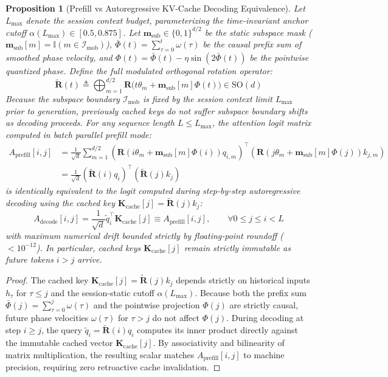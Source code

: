 \documentclass[11pt,a4paper]{article}
\newtheorem{proposition}[theorem]{Proposition}
\theoremstyle{definition}
\begin{document}
\begin{proposition}[Prefill vs Autoregressive KV-Cache Decoding Equivalence]
\label{prop:kv_cache}
Let $L_{\max}$ denote the session context budget, parameterizing the time-invariant anchor cutoff $\alpha(L_{\max}) \in [0.5, 0.875]$. Let $\mathbf{m}_{\text{sub}} \in \{0, 1\}^{d/2}$ be the static subspace mask ($\mathbf{m}_{\text{sub}}[m] = \mathbb{I}(m \in \mathcal{I}_{\text{mob}})$), $\bar{\Phi}(t) = \sum_{\tau=0}^t \omega(\tau)$ be the causal prefix sum of smoothed phase velocity, and $\Phi(t) = \bar{\Phi}(t) - \eta\sin(2\bar{\Phi}(t))$ be the pointwise quantized phase. Define the full modulated orthogonal rotation operator:
\begin{equation}
\tilde{\mathbf{R}}(t) \triangleq \bigoplus_{m=1}^{d/2} \mathbf{R}\big(t\theta_m + \mathbf{m}_{\text{sub}}[m]\Phi(t)\big) \in \mathrm{SO}(d)
\end{equation}
Because the subspace boundary $\mathcal{I}_{\text{mob}}$ is fixed by the session context limit $L_{\max}$ prior to generation, previously cached keys do not suffer subspace boundary shifts as decoding proceeds. For any sequence length $L \le L_{\max}$, the attention logit matrix computed in batch parallel prefill mode:
\begin{align}
A_{\mathrm{prefill}}[i, j] &= \frac{1}{\sqrt{d}} \sum_{m=1}^{d/2} \left( \mathbf{R}(i\theta_m + \mathbf{m}_{\text{sub}}[m]\Phi(i)) q_{i,m} \right)^\top \left( \mathbf{R}(j\theta_m + \mathbf{m}_{\text{sub}}[m]\Phi(j)) k_{j,m} \right) \nonumber \\
&= \frac{1}{\sqrt{d}} \left( \tilde{\mathbf{R}}(i) q_i \right)^\top \left( \tilde{\mathbf{R}}(j) k_j \right)
\end{align}
is identically equivalent to the logit computed during step-by-step autoregressive decoding using the cached key $\mathbf{K}_{\mathrm{cache}}[j] = \tilde{\mathbf{R}}(j) k_j$:
\begin{equation}
A_{\mathrm{decode}}[i, j] = \frac{1}{\sqrt{d}} \tilde{q}_i^\top \mathbf{K}_{\mathrm{cache}}[j] \equiv A_{\mathrm{prefill}}[i, j], \qquad \forall 0 \le j \le i < L
\end{equation}
with maximum numerical drift bounded strictly by floating-point roundoff ($< 10^{-12}$). In particular, cached keys $\mathbf{K}_{\mathrm{cache}}[j]$ remain strictly immutable as future tokens $i > j$ arrive.
\end{proposition}
\begin{proof}
The cached key $\mathbf{K}_{\mathrm{cache}}[j] = \tilde{\mathbf{R}}(j) k_j$ depends strictly on historical inputs $h_\tau$ for $\tau \le j$ and the session-static cutoff $\alpha(L_{\max})$. Because both the prefix sum $\bar{\Phi}(j) = \sum_{\tau=0}^j \omega(\tau)$ and the pointwise projection $\Phi(j)$ are strictly causal, future phase velocities $\omega(\tau)$ for $\tau > j$ do not affect $\Phi(j)$. During decoding at step $i \ge j$, the query $\tilde{q}_i = \tilde{\mathbf{R}}(i) q_i$ computes its inner product directly against the immutable cached vector $\mathbf{K}_{\mathrm{cache}}[j]$. By associativity and bilinearity of matrix multiplication, the resulting scalar matches $A_{\mathrm{prefill}}[i, j]$ to machine precision, requiring zero retroactive cache invalidation.
\end{proof}
\end{document}
